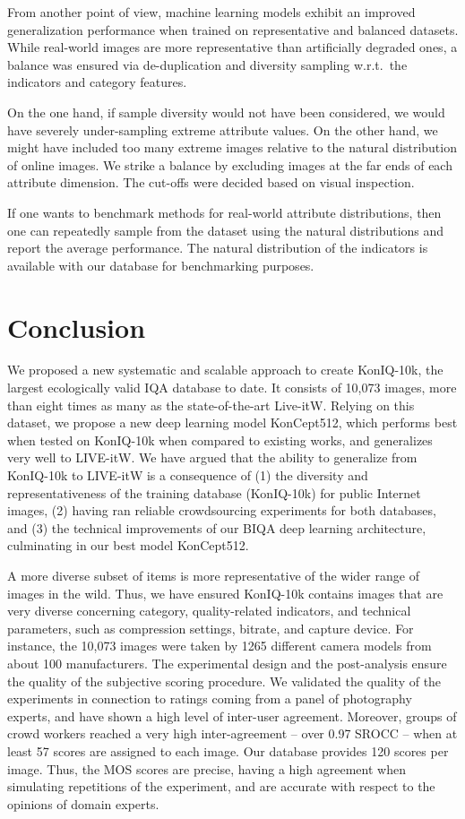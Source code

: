 \documentclass[10pt,journal,compsoc]{IEEEtran}
\begin{document}
From another point of view, machine learning models exhibit an improved generalization performance when trained on representative and balanced datasets. While real-world images are more representative than artificially degraded ones, a balance was ensured via de-duplication and diversity sampling w.r.t.\ the indicators and category features. 

On the one hand, if sample diversity would not have been considered, we would have severely under-sampling extreme attribute values. On the other hand, we might have included too many extreme images relative to the natural distribution of online images. We strike a balance by excluding images at the far ends of each attribute dimension. The cut-offs were decided based on visual inspection.

If one wants to benchmark methods for real-world attribute distributions, then one can repeatedly sample from the dataset using the natural distributions and report the average performance. The natural distribution of the indicators is available with our database for benchmarking purposes.

\section{Conclusion}
\label{sec:conc}

We proposed a new systematic and scalable approach to create KonIQ-10k, the largest ecologically valid IQA database to date. It consists of 10,073 images, more than eight times as many as the state-of-the-art Live-itW. Relying on this dataset, we propose a new deep learning model {KonCept512}, which performs best when tested on KonIQ-10k when compared to existing works, and generalizes very well to LIVE-itW. We have argued that the ability to generalize from KonIQ-10k to LIVE-itW is a consequence of (1) the diversity and representativeness of the training database (KonIQ-10k) for public Internet images, (2) having ran reliable crowdsourcing experiments for both databases, and (3) the technical improvements of our BIQA deep learning architecture, culminating in our best model {KonCept512}.

A more diverse subset of items is more representative of the wider range of images in the wild. Thus, we have ensured KonIQ-10k contains images that are very diverse concerning category, quality-related indicators, and technical parameters, such as compression settings, bitrate, and capture device. For instance, the 10,073 images were taken by 1265 different camera models from about 100 manufacturers.
The experimental design and the post-analysis ensure the quality of the subjective scoring procedure. We validated the quality of the experiments in connection to ratings coming from a panel of photography experts, and have shown a high level of inter-user agreement. Moreover, groups of crowd workers reached a very high inter-agreement -- over 0.97 SROCC -- when at least 57 scores are assigned to each image. Our database provides 120 scores per image. Thus, the MOS scores are precise, having a high agreement when simulating repetitions of the experiment, and are accurate with respect to the opinions of domain experts.
\end{document}
